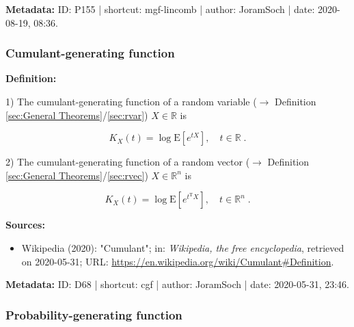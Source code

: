 \documentclass[a4paper,12pt,twoside]{book}
\begin{document}
\vspace{1em}
\textbf{Metadata:} ID: P155 | shortcut: mgf-lincomb | author: JoramSoch | date: 2020-08-19, 08:36.
\vspace{1em}



\subsubsection[\textit{Cumulant-generating function}]{Cumulant-generating function} \label{sec:cgf}
\setcounter{equation}{0}

\textbf{Definition:}

1) The cumulant-generating function of a random variable ($\rightarrow$ Definition \ref{sec:General Theorems}/\ref{sec:rvar}) $X \in \mathbb{R}$ is

\begin{equation} \label{eq:cgf-cgf-var}
K_X(t) = \log \mathrm{E} \left[ e^{tX} \right], \quad t \in \mathbb{R} \; .
\end{equation}

2) The cumulant-generating function of a random vector ($\rightarrow$ Definition \ref{sec:General Theorems}/\ref{sec:rvec}) $X \in \mathbb{R}^n$ is

\begin{equation} \label{eq:cgf-cgf-vec}
K_X(t) = \log \mathrm{E} \left[ e^{t^\mathrm{T}X} \right], \quad t \in \mathbb{R}^n \; .
\end{equation}


\vspace{1em}
\textbf{Sources:}
\begin{itemize}
\item Wikipedia (2020): "Cumulant"; in: \textit{Wikipedia, the free encyclopedia}, retrieved on 2020-05-31; URL: \url{https://en.wikipedia.org/wiki/Cumulant#Definition}.
\end{itemize}


\vspace{1em}
\textbf{Metadata:} ID: D68 | shortcut: cgf | author: JoramSoch | date: 2020-05-31, 23:46.
\vspace{1em}



\subsubsection[\textit{Probability-generating function}]{Probability-generating function} \label{sec:pgf}
\setcounter{equation}{0}
\end{document}
